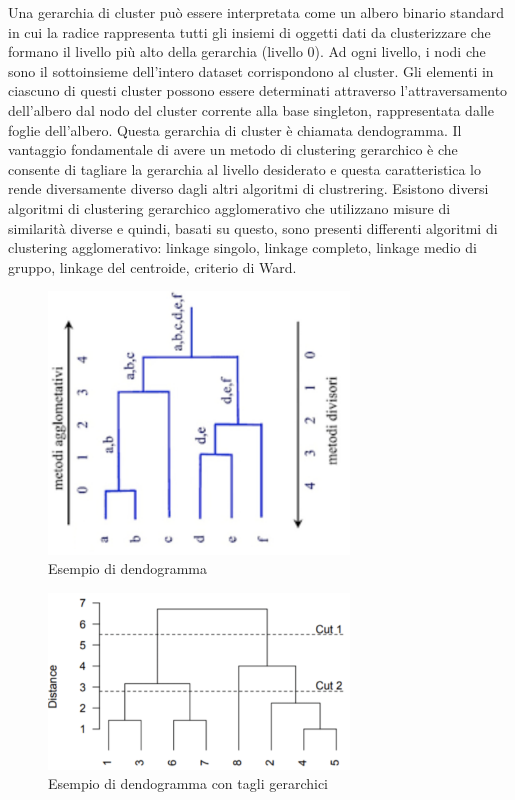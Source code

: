 \documentclass[12pt, a4paper, italian]{report}
\numberwithin{figure}{chapter}
\numberwithin{table}{chapter}
\begin{document}
Una gerarchia di cluster può essere interpretata come un albero binario standard in cui la radice rappresenta tutti gli insiemi di oggetti dati da clusterizzare che formano il livello più alto della gerarchia (livello 0). Ad ogni livello, i nodi che sono il sottoinsieme dell'intero dataset corrispondono al cluster. Gli elementi in ciascuno di questi cluster possono essere determinati attraverso l'attraversamento dell'albero dal nodo del cluster corrente alla base singleton, rappresentata dalle foglie dell'albero. Questa gerarchia di cluster è chiamata dendogramma. Il vantaggio fondamentale di avere un metodo di clustering gerarchico è che consente di tagliare la gerarchia al livello desiderato e questa caratteristica lo rende diversamente diverso dagli altri algoritmi di clustrering. Esistono diversi algoritmi di clustering gerarchico agglomerativo che utilizzano misure di similarità diverse e quindi, basati su questo, sono presenti differenti algoritmi di clustering agglomerativo: linkage singolo, linkage completo, linkage medio di gruppo, linkage del centroide, criterio di Ward.

\begin{figure}[h] \centering
\includegraphics[width=8cm]{C_Gerarchico1.png}
\caption{Esempio di dendogramma\protect\footnotemark}
\label{fig:esempio di clustering gerarchico}
\end{figure}

\vspace{1cm}

\begin{figure}[h] \centering
\includegraphics[width=8cm]{C_Gerarchico2.png}
\caption{Esempio di dendogramma con tagli gerarchici\protect\footnotemark}
\label{fig:esempio dendogramma}
\end{figure}
\end{document}
